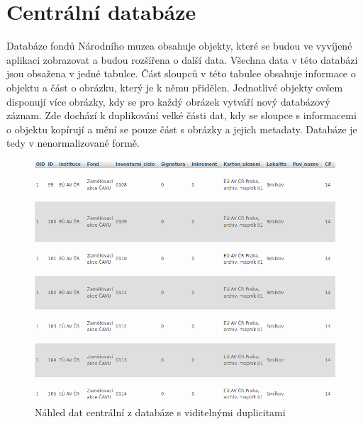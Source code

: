 \section{Centrální databáze}
\label{centralni-db}
Databáze fondů Národního muzea obsahuje objekty, které se budou ve 
vyvíjené aplikaci zobrazovat a budou rozšířena o další data. Všechna data 
v této databázi jsou obsažena v jedné tabulce. Část sloupců v této tabulce 
obsahuje informace o objektu a část o obrázku, který je k němu přidělen. 
Jednotlivé objekty ovšem disponují více obrázky, kdy se pro každý obrázek
vytváří nový databázový záznam. Zde dochází k duplikování velké části dat, 
kdy se sloupce s informacemi o objektu kopírují a mění se pouze část s 
obrázky a jejich metadaty. Databáze je tedy v nenormalizované formě.

\begin{figure}[H] \centering
    \includegraphics[width=420pt]{./pictures/5-ukazka-basedata.PNG}
    \caption[Náhled dat z centrální databáze s viditelnými duplicitami]{Náhled dat centrální z databáze s viditelnými duplicitami}
	\label{fig:Náhled dat z centrální databáze s viditelnými duplicitami}              
\end{figure}


